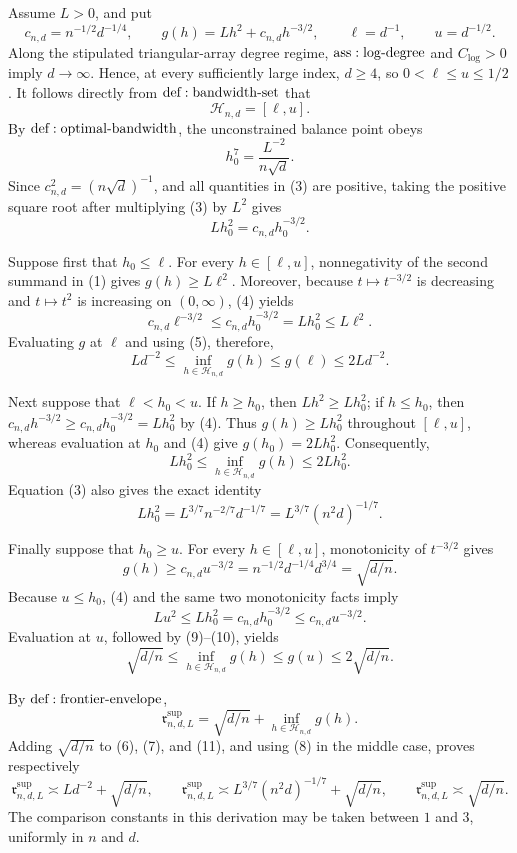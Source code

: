 Assume \(L>0\), and put
\[
 c_{n,d}=n^{-1/2}d^{-1/4},\qquad
 g(h)=Lh^2+c_{n,d}h^{-3/2},\qquad
 \ell=d^{-1},\qquad u=d^{-1/2}.
\tag{1}
\]
Along the stipulated triangular-array degree regime, \({\rm ass:log\text{-}degree}\) and \(C_{\log}>0\) imply \(d\to\infty\).  Hence, at every sufficiently large index, \(d\geq4\), so \(0<\ell\leq u\leq1/2\).  It follows directly from \({\rm def:bandwidth\text{-}set}\) that
\[
 \mathcal H_{n,d}=[\ell,u].
\tag{2}
\]
By \({\rm def:optimal\text{-}bandwidth}\), the unconstrained balance point obeys
\[
 h_0^7=\frac{L^{-2}}{n\sqrt d}.
\tag{3}
\]
Since \(c_{n,d}^2=(n\sqrt d)^{-1}\), and all quantities in (3) are positive, taking the positive square root after multiplying (3) by \(L^2\) gives
\[
 Lh_0^2=c_{n,d}h_0^{-3/2}.
\tag{4}
\]

Suppose first that \(h_0\leq\ell\).  For every \(h\in[\ell,u]\), nonnegativity of the second summand in (1) gives \(g(h)\geq L\ell^2\).  Moreover, because \(t\mapsto t^{-3/2}\) is decreasing and \(t\mapsto t^2\) is increasing on \((0,\infty)\), (4) yields
\[
 c_{n,d}\ell^{-3/2}
 \leq c_{n,d}h_0^{-3/2}
 =Lh_0^2
 \leq L\ell^2.
\tag{5}
\]
Evaluating \(g\) at \(\ell\) and using (5), therefore,
\[
 Ld^{-2}
 \leq \inf_{h\in\mathcal H_{n,d}}g(h)
 \leq g(\ell)
 \leq 2Ld^{-2}.
\tag{6}
\]

Next suppose that \(\ell<h_0<u\).  If \(h\geq h_0\), then \(Lh^2\geq Lh_0^2\); if \(h\leq h_0\), then \(c_{n,d}h^{-3/2}\geq c_{n,d}h_0^{-3/2}=Lh_0^2\) by (4).  Thus \(g(h)\geq Lh_0^2\) throughout \([\ell,u]\), whereas evaluation at \(h_0\) and (4) give \(g(h_0)=2Lh_0^2\).  Consequently,
\[
 Lh_0^2
 \leq \inf_{h\in\mathcal H_{n,d}}g(h)
 \leq 2Lh_0^2.
\tag{7}
\]
Equation (3) also gives the exact identity
\[
 Lh_0^2=L^{3/7}n^{-2/7}d^{-1/7}
 =L^{3/7}(n^2d)^{-1/7}.
\tag{8}
\]

Finally suppose that \(h_0\geq u\).  For every \(h\in[\ell,u]\), monotonicity of \(t^{-3/2}\) gives
\[
 g(h)\geq c_{n,d}u^{-3/2}
 =n^{-1/2}d^{-1/4}d^{3/4}
 =\sqrt{d/n}.
\tag{9}
\]
Because \(u\leq h_0\), (4) and the same two monotonicity facts imply
\[
 Lu^2\leq Lh_0^2=c_{n,d}h_0^{-3/2}\leq c_{n,d}u^{-3/2}.
\tag{10}
\]
Evaluation at \(u\), followed by (9)--(10), yields
\[
 \sqrt{d/n}
 \leq \inf_{h\in\mathcal H_{n,d}}g(h)
 \leq g(u)
 \leq 2\sqrt{d/n}.
\tag{11}
\]

By \({\rm def:frontier\text{-}envelope}\),
\[
 \mathfrak r^{\mathrm{sup}}_{n,d,L}
 =\sqrt{d/n}+\inf_{h\in\mathcal H_{n,d}}g(h).
\tag{12}
\]
Adding \(\sqrt{d/n}\) to (6), (7), and (11), and using (8) in the middle case, proves respectively
\[
 \mathfrak r^{\mathrm{sup}}_{n,d,L}
 \asymp Ld^{-2}+\sqrt{d/n},
 \qquad
 \mathfrak r^{\mathrm{sup}}_{n,d,L}
 \asymp L^{3/7}(n^2d)^{-1/7}+\sqrt{d/n},
 \qquad
 \mathfrak r^{\mathrm{sup}}_{n,d,L}
 \asymp\sqrt{d/n}.
\tag{13}
\]
The comparison constants in this derivation may be taken between \(1\) and \(3\), uniformly in \(n\) and \(d\).

